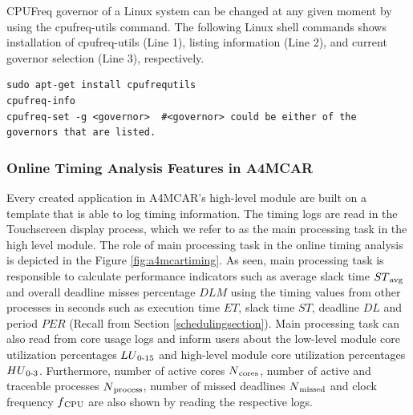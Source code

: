 CPUFreq governor of a Linux system can be changed at any given moment by using the cpufreq-utils command. The following Linux shell commands shows installation of cpufreq-utils (Line 1), listing information (Line 2), and current governor selection (Line 3), respectively.
\begin{lstlisting}
sudo apt-get install cpufrequtils
cpufreq-info
cpufreq-set -g <governor>  #<governor> could be either of the governors that are listed.
\end{lstlisting}

\subsubsection{Online Timing Analysis Features in A4MCAR}
Every created application in A4MCAR's high-level module are built on a template that is able to log timing information. The timing logs are read in the Touchscreen display process, which we refer to as the main processing task in the high level module. The role of main processing task in the online timing analysis is depicted in the Figure \ref{fig:a4mcartiming}. As seen, main processing task is responsible to calculate performance indicators such as average slack time ${ST\textsubscript{avg}}$ and overall deadline misses percentage ${DLM}$ using the timing values from other processes in seconds such as execution time ${ET}$, slack time ${ST}$, deadline ${DL}$ and period ${PER}$ (Recall from Section \ref{schedulingsection}). Main processing task can also read from core usage logs and inform users about the low-level module core utilization percentages ${LU\textsubscript{0-15}}$ and high-level module core utilization percentages ${HU\textsubscript{0-3}}$. Furthermore, number of active cores ${N\textsubscript{cores}}$, number of active and traceable processes ${N\textsubscript{process}}$, number of missed deadlines ${N\textsubscript{missed}}$ and clock frequency ${f\textsubscript{CPU}}$ are also shown by reading the respective logs. 
